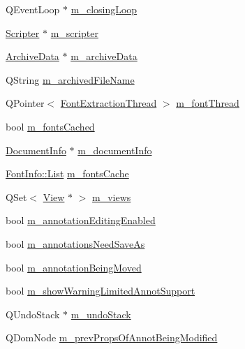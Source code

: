\begin{DoxyCompactItemize}
\item 
Q\+Event\+Loop $\ast$ \hyperlink{classOkular_1_1DocumentPrivate_a836cb1b614d8d25bad8403dfd746ef00}{m\+\_\+closing\+Loop}
\item 
\hyperlink{classOkular_1_1Scripter}{Scripter} $\ast$ \hyperlink{classOkular_1_1DocumentPrivate_aa92ce51e07aaab18bd40542eb9bc31e6}{m\+\_\+scripter}
\item 
\hyperlink{structArchiveData}{Archive\+Data} $\ast$ \hyperlink{classOkular_1_1DocumentPrivate_a135bb6fa2886b0eb86e9a1b72fd8d25b}{m\+\_\+archive\+Data}
\item 
Q\+String \hyperlink{classOkular_1_1DocumentPrivate_ac47be11934cb0cb3e7d8876e3e4653af}{m\+\_\+archived\+File\+Name}
\item 
Q\+Pointer$<$ \hyperlink{classOkular_1_1FontExtractionThread}{Font\+Extraction\+Thread} $>$ \hyperlink{classOkular_1_1DocumentPrivate_a7d89f5349531b52b4109855269a6a4c4}{m\+\_\+font\+Thread}
\item 
bool \hyperlink{classOkular_1_1DocumentPrivate_aa33ab887df80e7df7c9d7a5eecff000e}{m\+\_\+fonts\+Cached}
\item 
\hyperlink{classOkular_1_1DocumentInfo}{Document\+Info} $\ast$ \hyperlink{classOkular_1_1DocumentPrivate_a4452394f3abc747fa0b4910c33806371}{m\+\_\+document\+Info}
\item 
\hyperlink{classOkular_1_1FontInfo_ada799641ba87703c808645f57fdfafaa}{Font\+Info\+::\+List} \hyperlink{classOkular_1_1DocumentPrivate_a9be70502279da0a275889e504409c7e5}{m\+\_\+fonts\+Cache}
\item 
Q\+Set$<$ \hyperlink{classOkular_1_1View}{View} $\ast$ $>$ \hyperlink{classOkular_1_1DocumentPrivate_aae4139cb4cb2f63fd7c7c88f26199976}{m\+\_\+views}
\item 
bool \hyperlink{classOkular_1_1DocumentPrivate_a700587218254ae03f4ade5fee8ff487c}{m\+\_\+annotation\+Editing\+Enabled}
\item 
bool \hyperlink{classOkular_1_1DocumentPrivate_a44f722aa34fee888929abd92fe54ad82}{m\+\_\+annotations\+Need\+Save\+As}
\item 
bool \hyperlink{classOkular_1_1DocumentPrivate_a57c1dee8543960398669cb927fab17cc}{m\+\_\+annotation\+Being\+Moved}
\item 
bool \hyperlink{classOkular_1_1DocumentPrivate_a1d12aaa9b1f2726a8e19b416587062c9}{m\+\_\+show\+Warning\+Limited\+Annot\+Support}
\item 
Q\+Undo\+Stack $\ast$ \hyperlink{classOkular_1_1DocumentPrivate_a64bc3f1453fc2312423889c869d89a73}{m\+\_\+undo\+Stack}
\item 
Q\+Dom\+Node \hyperlink{classOkular_1_1DocumentPrivate_a7f5fc408d6af006eaa4c2991ee263403}{m\+\_\+prev\+Props\+Of\+Annot\+Being\+Modified}
\end{DoxyCompactItemize}



